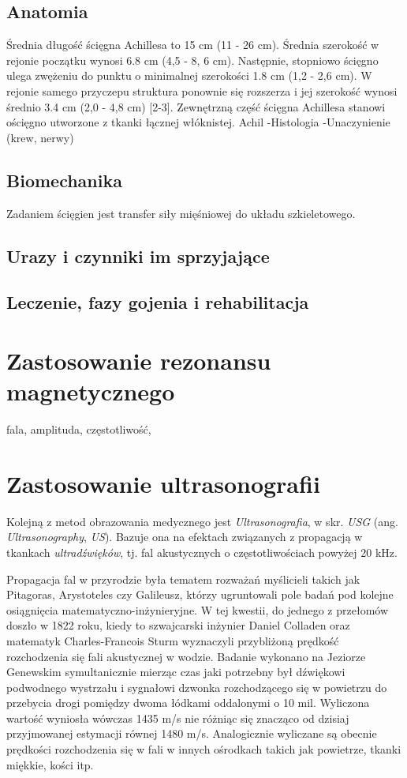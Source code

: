 \subsection{Anatomia}
Średnia długość ścięgna Achillesa to 15 cm (11 - 26 cm). Średnia szerokość w rejonie początku wynosi 6.8 cm (4,5 - 8, 6 cm). Następnie, stopniowo ścięgno ulega zwężeniu do punktu o minimalnej szerokości 1.8 cm (1,2 - 2,6 cm). W rejonie samego przyczepu struktura ponownie się rozszerza i jej szerokość wynosi średnio 3.4 cm (2,0 - 4,8 cm) [2-3].
Zewnętrzną część ścięgna Achillesa stanowi ościęgno utworzone z tkanki łącznej włóknistej.
Achil
-Histologia
-Unaczynienie (krew, nerwy)

\subsection{Biomechanika}
Zadaniem ścięgien jest transfer siły mięśniowej do układu szkieletowego.
\subsection{Urazy i czynniki im sprzyjające}
\subsection{Leczenie, fazy gojenia i rehabilitacja}
\label{gojenie}
\section{Zastosowanie rezonansu magnetycznego}
fala, amplituda, częstotliwość, 
\section{Zastosowanie ultrasonografii}

Kolejną z metod obrazowania medycznego jest \textit{Ultrasonografia}, w skr. \textit{USG} (ang. \textit{Ultrasonography}, \textit{US}). Bazuje ona na efektach związanych z propagacją w tkankach \textit{ultradźwięków}, tj. fal akustycznych o częstotliwościach powyżej 20 kHz.

Propagacja fal w przyrodzie była tematem rozważań myślicieli takich jak Pitagoras, Arystoteles czy Galileusz, którzy ugruntowali pole badań pod kolejne osiągnięcia matematyczno-inżynieryjne. W tej kwestii, do jednego z przełomów doszło w 1822 roku, kiedy to szwajcarski inżynier Daniel Colladen oraz matematyk Charles-Francois Sturm wyznaczyli przybliżoną prędkość rozchodzenia się fali akustycznej w wodzie. Badanie wykonano na Jeziorze Genewskim symultanicznie mierząc czas jaki potrzebny był dźwiękowi podwodnego wystrzału i sygnałowi dzwonka rozchodzącego się w powietrzu do przebycia drogi pomiędzy dwoma łódkami oddalonymi o 10 mil. Wyliczona wartość wyniosła wówczas 1435 m/s nie różniąc się znacząco od dzisiaj przyjmowanej estymacji równej 1480 m/s. Analogicznie wyliczane są obecnie prędkości rozchodzenia się w fali w innych ośrodkach takich jak powietrze, tkanki miękkie, kości itp.


